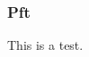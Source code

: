 \documentclass{beamer}
\begin{document}
\begin{frame}[t]
\frametitle{Pft}
This is a test.
\end{frame}
\end{document}
